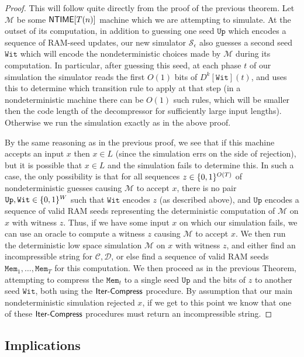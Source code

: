 \begin{proof}
This will follow quite directly from the proof of the previous theorem. Let $\mathcal{M}$ be some $\cl{NTIME}[T(n)]$ machine which we are attempting to simulate. At the outset of its computation, in addition to guessing one seed $\mathtt{Up}$ which encodes a sequence of RAM-seed updates, our new simulator $\mathcal{S}_{\epsilon}$ also guesses a second seed $\mathtt{Wit}$ which will encode the nondeterministic choices made by $\mathcal{M}$ during its computation. In particular, after guessing this seed, at each phase $t$ of our simulation the simulator reads the first $O(1)$ bits of $D^k[\mathtt{Wit}](t)$, and uses this to determine which transition rule to apply at that step (in a nondeterministic machine there can be $O(1)$ such rules, which will be smaller then the code length of the decompressor for sufficiently large input lengths). Otherwise we run the simulation exactly as in the above proof.

By the same reasoning as in the previous proof, we see that if this machine accepts an input $x$ then $x \in L$ (since the simulation errs on the side of rejection), but it is possible that $x \in L$ and the simulation fails to determine this. In such a case, the only possibility is that for all sequences $z \in \{0,1\}^{O(T)}$ of nondeterministic guesses causing $\mathcal{M}$ to accept $x$, there is no pair $\mathtt{Up},\mathtt{Wit} \in \{0,1\}^W$ such that $\mathtt{Wit}$ encodes $z$ (as described above), and $\mathtt{Up}$ encodes a sequence of valid RAM seeds representing the deterministic computation of $\mathcal{M}$ on $x$ with witness $z$. Thus, if we have some input $x$ on which our simulation fails, we can use an  oracle to compute a witness $z$ causing $\mathcal{M}$ to accept $x$. We then run the deterministic low space simulation $\mathcal{M}$ on $x$ with witness $z$, and either find an incompressible string for $\mathcal{C},\mathcal{D}$, or else find a sequence of valid RAM seeds $\mathtt{Mem}_1,\ldots,\mathtt{Mem}_T$ for this computation. We then proceed as in the previous Theorem, attempting to compress the $\mathtt{Mem}_t$ to a single seed $\mathtt{Up}$ and the bits of $z$ to another seed $\mathtt{Wit}$, both using the $\mathsf{Iter\text{-} Compress}$ procedure. By assumption that our main nondeterministic simulation rejected $x$, if we get to this point we know that one of these $\mathsf{Iter\text{-} Compress}$ procedures must return an incompressible string. 
\end{proof}


\subsection{Implications}\label{lossy:subsec:implications}

